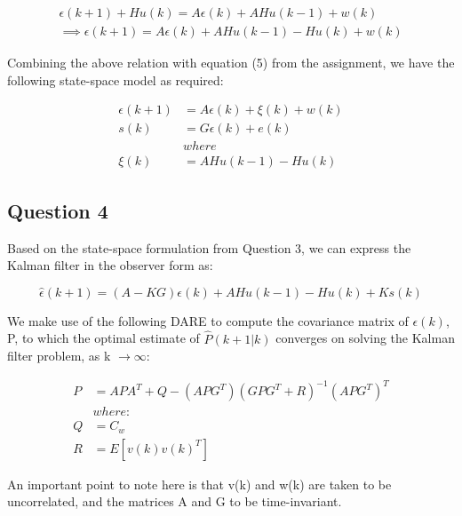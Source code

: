 \documentclass[12pt]{report}
\begin{document}
\begin{equation*}
\begin{aligned}
\epsilon(k+1) + Hu(k) = A\epsilon(k) + AHu(k-1) + w(k)\\
\implies \epsilon(k+1) = A\epsilon(k) + AHu(k-1) - Hu(k) + w(k)
\end{aligned}
\end{equation*} 

Combining the above relation with equation (5) from the assignment, we have the following state-space model as required:

\begin{equation*}
\begin{aligned}
\epsilon(k+1) &= A\epsilon(k) + \xi(k) + w(k)\\
s(k) &= G\epsilon(k) + e(k)\\
&where\\
\xi(k) &= AHu(k-1) - Hu(k)
\end{aligned}
\end{equation*} 

\subsection*{Question 4}

Based on the state-space formulation from Question 3, we can express the Kalman filter in the observer form as:

\begin{equation*}
	\hat\epsilon(k+1) = (A - KG)\epsilon(k) + AHu(k-1) - Hu(k) + Ks(k)
\end{equation*}

We make use of the following DARE to compute the covariance matrix of $\epsilon(k)$, P, to which the optimal estimate of $\hat P(k+1|k)$ converges on solving the Kalman filter problem, as k $\rightarrow \infty$:

\begin{equation*}
\begin{aligned}
P &= APA^{T} + Q - (APG^{T})(GPG^{T} + R)^{-1}(APG^{T})^{T}\\
&where:\\
Q &= C_{w}\\
R &= E[v(k)v(k)^{T}]
\end{aligned}
\end{equation*}

An important point to note here is that v(k) and w(k) are taken to be uncorrelated, and the matrices A and G to be time-invariant.
\end{document}
